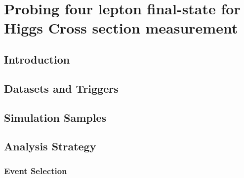 \documentclass[
12pt, %
english, %
singlespacing, %
liststotoc, %
headsepline, %
]{MastersDoctoralThesis} %
\begin{document}
%
\chapter{Probing four lepton final-state for Higgs Cross section measurement}\label{Chapter4}
  \section{Introduction}\label{sec:Introduction}
    \section{Datasets and Triggers}\label{sec:Datasets}
    \section{Simulation Samples} \label{sec:Simulations}
  \section{Analysis Strategy}\label{sec:AnalysisStrategy} %
    \label{sec:GeneralStrategy} %
    \subsection{Event Selection }\label{sec:EventsBackgrounds}
      \label{sec:events_selection}  %
\end{document}

